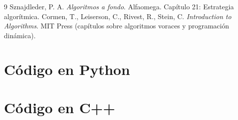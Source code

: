 \documentclass[12pt,a4paper]{article}
\begin{document}
\begin{thebibliography}{9}
 Sznajdleder, P. A. \emph{Algoritmos a fondo}. Alfaomega. Capítulo 21: Estrategia algorítmica.
 Cormen, T., Leiserson, C., Rivest, R., Stein, C. \emph{Introduction to Algorithms}. MIT Press (capítulos sobre algoritmos voraces y programación dinámica).
\end{thebibliography}

\appendix
\section{Código en Python}


\section{Código en C++}

\end{document}
